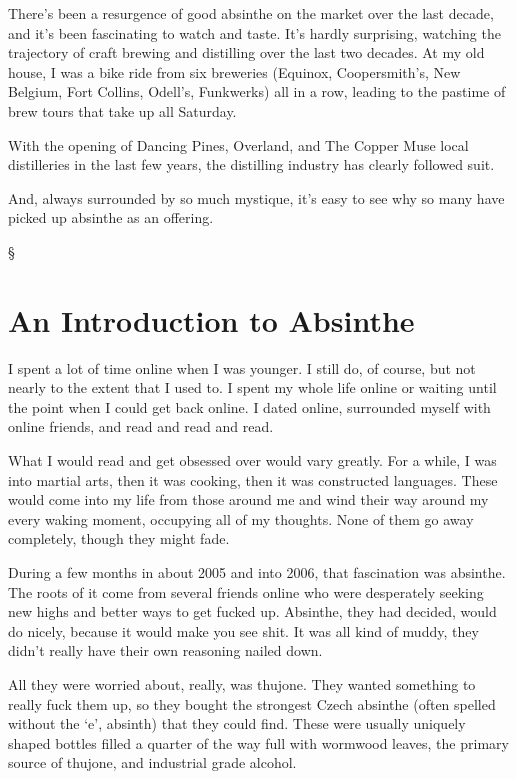 \documentclass[12pt,letterpaper,oneside]{memoir}
\newcommand\secdiv{
  \begin{center}
    \S
  \end{center}
}
\begin{document}
  There's been a resurgence of good absinthe on the market over the last decade, and it's been fascinating to watch and taste.  It's hardly surprising, watching the trajectory of craft brewing and distilling over the last two decades.  At my old house, I was a bike ride from six breweries (Equinox, Coopersmith's, New Belgium, Fort Collins,  Odell's, Funkwerks) all in a row, leading to the pastime of brew tours that take up all Saturday.

  With the opening of Dancing Pines, Overland, and The Copper Muse local distilleries in the last few years, the distilling industry has clearly followed suit.

  And, always surrounded by so much mystique, it's easy to see why so many have picked up absinthe as an offering.

  \secdiv

  \section*{An Introduction to Absinthe}

  I spent a lot of time online when I was younger.  I still do, of course, but not nearly to the extent that I used to.  I spent my whole life online or waiting until the point when I could get back online.  I dated online, surrounded myself with online friends, and read and read and read.

  What I would read and get obsessed over would vary greatly.  For a while, I was into martial arts, then it was cooking, then it was constructed languages.  These would come into my life from those around me and wind their way around my every waking moment, occupying all of my thoughts.  None of them go away completely, though they might fade.

  During a few months in about 2005 and into 2006, that fascination was absinthe.  The roots of it come from several friends online who were desperately seeking new highs and better ways to get fucked up.  Absinthe, they had decided, would do nicely, because it would make you see shit.  It was all kind of muddy, they didn't really have their own reasoning nailed down.

  All they were worried about, really, was thujone.  They wanted something to really fuck them up, so they bought the strongest Czech absinthe (often spelled without the `e', absinth) that they could find.  These were usually uniquely shaped bottles filled a quarter of the way full with wormwood leaves, the primary source of thujone, and industrial grade alcohol.
\end{document}
